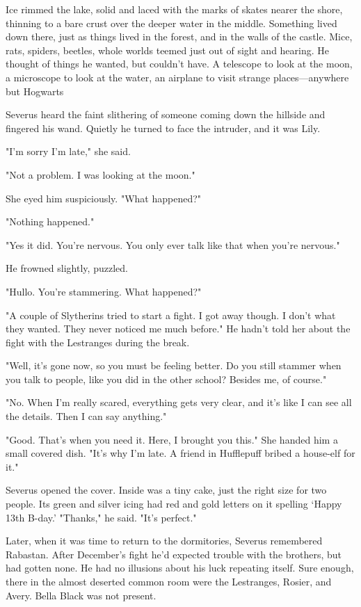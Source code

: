 Ice rimmed the lake, solid and laced with the marks of skates nearer the shore, thinning to a bare crust over the deeper water in the middle. Something lived down there, just as things lived in the forest, and in the walls of the castle. Mice, rats, spiders, beetles, whole worlds teemed just out of sight and hearing. He thought of things he wanted, but couldn't have. A telescope to look at the moon, a microscope to look at the water, an airplane to visit strange places—anywhere but Hogwarts{\el}

Severus heard the faint slithering of someone coming down the hillside and fingered his wand. Quietly he turned to face the intruder, and it was Lily.

"I'm sorry I'm late," she said.

"Not{\el} a problem. I was looking{\el} at the moon."

She eyed him suspiciously. "What happened?"

"Nothing{\el} happened."

"Yes it did. You're nervous. You only ever talk like that when you're nervous."

He frowned slightly, puzzled.

"Hullo. You're stammering. What happened?"

"A couple of{\el} Slytherins tried{\el} to start a fight. I got{\el} away though. I don't what they wanted. They never noticed me much before." He hadn't told her about the fight with the Lestranges during the break.

"Well, it's gone now, so you must be feeling better. Do you still stammer when you talk to people, like you did in the other school? Besides me, of course."

"No. When I'm really scared, everything gets very clear, and it's like I can see all the details. Then I can say anything."

"Good. That's when you need it. Here, I brought you this." She handed him a small covered dish. "It's why I'm late. A friend in Hufflepuff bribed a house-elf for it."

Severus opened the cover. Inside was a tiny cake, just the right size for two people. Its green and silver icing had red and gold letters on it spelling `Happy 13th B-day.' "Thanks," he said. "It's perfect."

Later, when it was time to return to the dormitories, Severus remembered Rabastan. After December's fight he'd expected trouble with the brothers, but had gotten none. He had no illusions about his luck repeating itself. Sure enough, there in the almost deserted common room were the Lestranges, Rosier, and Avery. Bella Black was not present.

